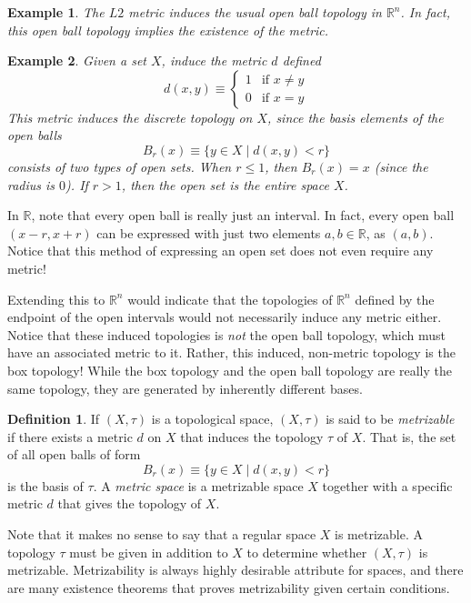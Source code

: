 \documentclass{article}
\newtheorem{example}{Example}[section]
\theoremstyle{remark}
\theoremstyle{definition}
\newtheorem{definition}{Definition}[section]
\begin{document}
\begin{example}
The $L2$ metric induces the usual open ball topology in $\mathbb{R}^n$. In fact, this open ball topology implies the existence of the metric. 
\end{example}

\begin{example}
Given a set $X$, induce the metric $d$ defined
\[d(x, y) \equiv \begin{cases}
      1 & \text{if } x \neq y \\
      0 & \text{if } x = y
\end{cases}\]
This metric induces the discrete topology on $X$, since the basis elements of the open balls
\[B_r (x) \equiv \{ y \in X \; | \; d(x, y) <r\}\]
consists of two types of open sets. When $r \leq 1$, then $B_r (x) = x$ (since the radius is $0$). If $r > 1$, then the open set is the entire space $X$. 
\end{example}

In $\mathbb{R}$, note that every open ball is really just an interval. In fact, every open ball $(x - r, x + r)$ can be expressed with just two elements $a, b \in \mathbb{R}$, as $(a, b)$. Notice that this method of expressing an open set does not even require any metric! 

Extending this to $\mathbb{R}^n$ would indicate that the topologies of $\mathbb{R}^n$ defined by the endpoint of the open intervals would not necessarily induce any metric either. Notice that these induced topologies is \textit{not} the open ball topology, which must have an associated metric to it. Rather, this induced, non-metric topology is the box topology! While the box topology and the open ball topology are really the same topology, they are generated by inherently different bases. 

\begin{definition}
If $(X, \tau)$ is a topological space, $(X, \tau)$ is said to be \textit{metrizable} if there exists a metric $d$ on $X$ that induces the topology $\tau$ of $X$. That is, the set of all open balls of form
\[B_r (x) \equiv \{ y \in X \; | \; d(x, y) < r \}\]
is the basis of $\tau$. A \textit{metric space} is a metrizable space $X$ together with a specific metric $d$ that gives the topology of $X$. 
\end{definition}

Note that it makes no sense to say that a regular space $X$ is metrizable. A topology $\tau$ must be given in addition to $X$ to determine whether $(X, \tau)$ is metrizable. Metrizability is always highly desirable attribute for spaces, and there are many existence theorems that proves metrizability given certain conditions. 
\end{document}
